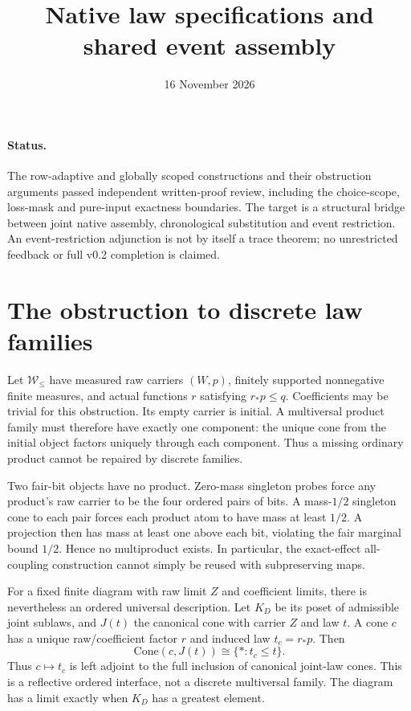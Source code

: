 \documentclass{article}
\title{Native law specifications and shared event assembly}
\date{16 November 2026}
\begin{document}
\maketitle
\paragraph{Status.} The row-adaptive and globally scoped constructions and their obstruction arguments passed independent written-proof review, including the choice-scope, loss-mask and pure-input exactness boundaries. The target is a structural bridge between joint native assembly, chronological substitution and event restriction. An event-restriction adjunction is not by itself a trace theorem; no unrestricted feedback or full v0.2 completion is claimed.
\section{The obstruction to discrete law families}
Let $\mathcal W_\le$ have measured raw carriers $(W,p)$, finitely supported nonnegative finite measures, and actual functions $r$ satisfying $r_*p\le q$. Coefficients may be trivial for this obstruction. Its empty carrier is initial. A multiversal product family must therefore have exactly one component: the unique cone from the initial object factors uniquely through each component. Thus a missing ordinary product cannot be repaired by discrete families.

Two fair-bit objects have no product. Zero-mass singleton probes force any product's raw carrier to be the four ordered pairs of bits. A mass-$1/2$ singleton cone to each pair forces each product atom to have mass at least $1/2$. A projection then has mass at least one above each bit, violating the fair marginal bound $1/2$. Hence no multiproduct exists. In particular, the exact-effect all-coupling construction cannot simply be reused with subpreserving maps.

For a fixed finite diagram with raw limit $Z$ and coefficient limits, there is nevertheless an ordered universal description. Let $K_D$ be its poset of admissible joint sublaws, and $J(t)$ the canonical cone with carrier $Z$ and law $t$. A cone $c$ has a unique raw/coefficient factor $r$ and induced law $t_c=r_*p$. Then
\[\mathrm{Cone}(c,J(t))\cong\{* : t_c\le t\}.\]
Thus $c\mapsto t_c$ is left adjoint to the full inclusion of canonical joint-law cones. This is a reflective ordered interface, not a discrete multiversal family. The diagram has a limit exactly when $K_D$ has a greatest element.
\end{document}
